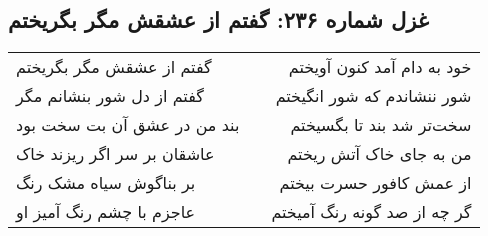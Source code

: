 \begin{center}
\section*{غزل شماره ۲۳۶: گفتم از عشقش مگر بگریختم}
\label{sec:236}
\begin{longtable}{l p{0.5cm} r}
گفتم از عشقش مگر بگریختم
&&
خود به دام آمد کنون آویختم
\\
گفتم از دل شور بنشانم مگر
&&
شور ننشاندم که شور انگیختم
\\
بند من در عشق آن بت سخت بود
&&
سخت‌تر شد بند تا بگسیختم
\\
عاشقان بر سر اگر ریزند خاک
&&
من به جای خاک آتش ریختم
\\
بر بناگوش سیاه مشک رنگ
&&
از عمش کافور حسرت بیختم
\\
عاجزم با چشم رنگ آمیز او
&&
گر چه از صد گونه رنگ آمیختم
\\
\end{longtable}
\end{center}
